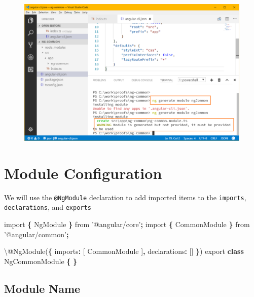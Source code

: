\documentclass[]{book}
\newenvironment{Shaded}{\begin{snugshade}}{\end{snugshade}}
\newcommand{\KeywordTok}[1]{\textcolor[rgb]{0.13,0.29,0.53}{\textbf{#1}}}
\newcommand{\DataTypeTok}[1]{\textcolor[rgb]{0.13,0.29,0.53}{#1}}
\newcommand{\StringTok}[1]{\textcolor[rgb]{0.31,0.60,0.02}{#1}}
\newcommand{\ImportTok}[1]{#1}
\newcommand{\OperatorTok}[1]{\textcolor[rgb]{0.81,0.36,0.00}{\textbf{#1}}}
\newcommand{\AttributeTok}[1]{\textcolor[rgb]{0.77,0.63,0.00}{#1}}
\newcommand{\NormalTok}[1]{#1}
\theoremstyle{definition}
\theoremstyle{definition}
\theoremstyle{definition}
\theoremstyle{remark}
\begin{document}
\begin{figure}
\centering
\includegraphics{images/ng-generate-module.png}
\caption{}
\end{figure}

\section{Module Configuration}\label{module-configuration}

We will use the \texttt{@NgModule} declaration to add imported items to
the \texttt{imports}, \texttt{declarations}, and \texttt{exports}

\begin{Shaded}
\begin{Highlighting}[]
\ImportTok{import} \OperatorTok{\{}\NormalTok{ NgModule }\OperatorTok{\}} \ImportTok{from} \StringTok{'@angular/core'}\OperatorTok{;}
\ImportTok{import} \OperatorTok{\{}\NormalTok{ CommonModule }\OperatorTok{\}} \ImportTok{from} \StringTok{'@angular/common'}\OperatorTok{;}

\NormalTok{\textbackslash{}@}\AttributeTok{NgModule}\NormalTok{(}\OperatorTok{\{}
  \DataTypeTok{imports}\OperatorTok{:}\NormalTok{ [}
\NormalTok{    CommonModule}
\NormalTok{  ]}\OperatorTok{,}
  \DataTypeTok{declarations}\OperatorTok{:}\NormalTok{ []}
\OperatorTok{\}}\NormalTok{)}
\ImportTok{export} \KeywordTok{class}\NormalTok{ NgCommonModule }\OperatorTok{\{} \OperatorTok{\}}
\end{Highlighting}
\end{Shaded}

\subsection{Module Name}\label{module-name}
\end{document}
